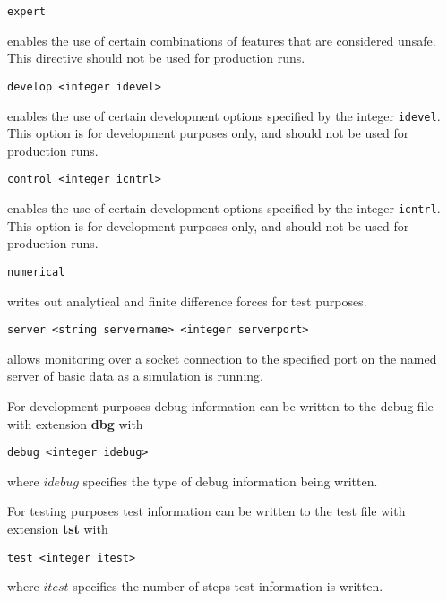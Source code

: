 \begin{description}
\item
\begin{verbatim}
expert
\end{verbatim}
enables the use of certain combinations of features that are considered
unsafe. This directive should not be used for production runs.

\item
\begin{verbatim}
develop <integer idevel>
\end{verbatim}
enables the use of certain development options specified by the
integer \verb+idevel+. This option is for development purposes only,
and should not be used for production runs.

\item
\begin{verbatim}
control <integer icntrl>
\end{verbatim}
enables the use of certain development options specified by the
integer \verb+icntrl+. This option is for development purposes only,
and should not be used for production runs.

\item
\begin{verbatim}
numerical
\end{verbatim}
writes out analytical and finite difference forces for test purposes.

\item
\begin{verbatim}
server <string servername> <integer serverport>
\end{verbatim}
allows monitoring over a socket connection to the specified port on the
named server of basic data as a simulation is running.

\item
For development purposes debug information can be written to the debug
file with extension {\bf dbg} with

\begin{verbatim}
debug <integer idebug>
\end{verbatim}
where $idebug$ specifies the type of debug information being written.

\item
For testing purposes test information can be written to the test
file with extension {\bf tst} with

\begin{verbatim}
test <integer itest>
\end{verbatim}
where $itest$ specifies the number of steps test information is written.


\end{description}
